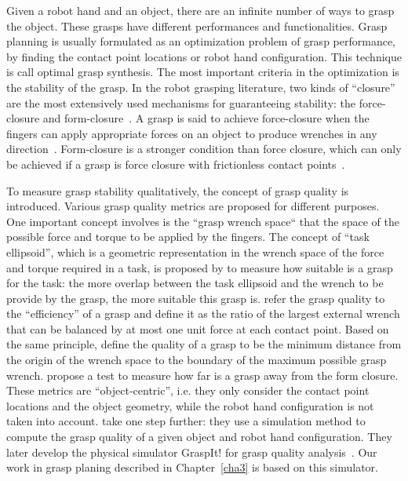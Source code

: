 Given a robot hand and an object, there are an infinite number of ways to grasp the object. These grasps have different performances and functionalities. Grasp planning is usually formulated as an optimization problem of grasp performance, by finding the contact point locations or robot hand configuration. This technique is call optimal grasp synthesis. The most important criteria in the optimization is the stability of the grasp. In the robot grasping literature, two kinds of ``closure'' are the most extensively used mechanisms for guaranteeing stability: the force-closure and form-closure~\citep{Nguyen87}. A grasp is said to achieve force-closure when the fingers can apply appropriate forces on an object to produce wrenches in any direction~\citep{SalisburyJr1985}. Form-closure is a stronger condition than force closure, which can only be achieved if a grasp is force closure with frictionless contact points~\citep{diziouglu1984mechanics}.

To measure grasp stability qualitatively, the concept of grasp quality is introduced. Various grasp quality metrics are proposed for different purposes. One important concept involves is the ``grasp wrench space`` that the space of the possible force and torque to be applied by the fingers.
The concept of ``task ellipsoid'', which is a geometric representation in the wrench space of the force and torque required in a task, is proposed by \citet{li1988task} to measure how suitable is a grasp for the task: the more overlap between the task ellipsoid and the wrench to be provide by the grasp, the more suitable this grasp is.
\citet{kirkpatrick1992quantitative} refer the grasp quality to the ``efficiency'' of a grasp and define it as the ratio of the largest external wrench that can be balanced by at most one unit force at each contact point. Based on the same principle, \citet{ferrari1992planning} define the quality of a grasp to be the minimum distance from the origin of the wrench space to the boundary of the maximum possible grasp wrench.
\citet{trinkle1992stability} propose a test to measure how far is a grasp away from the form closure.
These metrics are ``object-centric'', i.e. they only consider the contact point locations and the object geometry, while the robot hand configuration is not taken into account. \citet{miller1999examples} take one step further: they use a simulation method to compute the grasp quality of a given object and robot hand configuration. They later develop the physical simulator GraspIt! for grasp quality analysis~\citep{miller2004graspit}. Our work in grasp planing described in Chapter~\ref{cha3} is based on this simulator.

